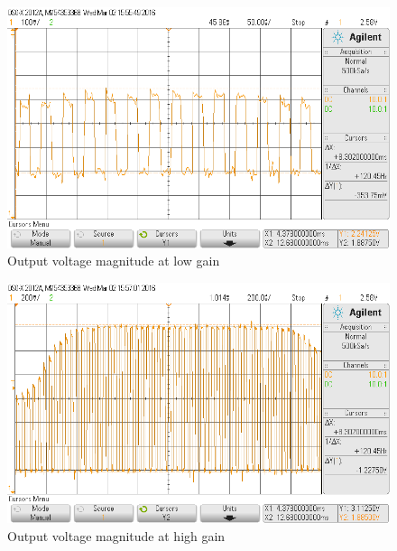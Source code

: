\begin{figure}[H]
\begin{center}
\includegraphics[scale=0.4]{LabFour/scope_81}
\end{center}
\caption{Output voltage magnitude at low gain}
\label{fig:spot3}
\end{figure}

\begin{figure}[H]
\begin{center}
\includegraphics[scale=0.4]{LabFour/scope_82}
\end{center}
\caption{Output voltage magnitude at high gain}
\label{fig:spot4}
\end{figure}



